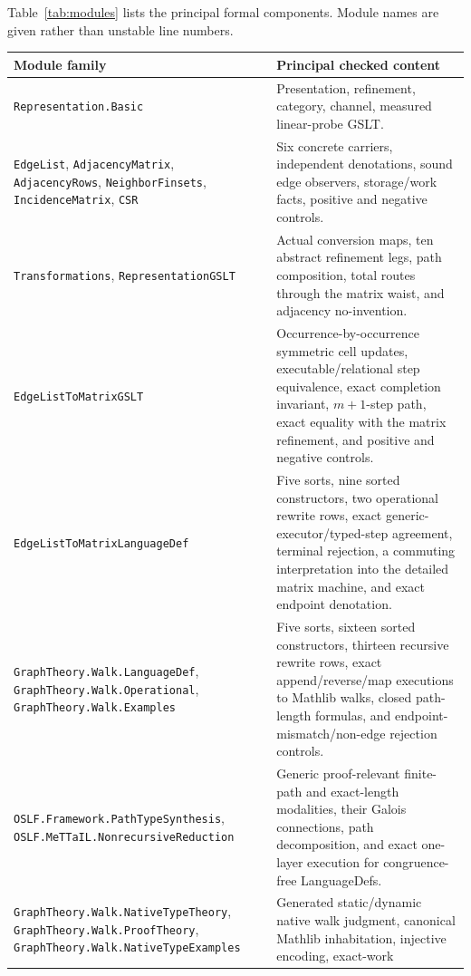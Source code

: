 \documentclass[11pt]{article}
\theoremstyle{remark}
\newcommand{\code}[1]{\texttt{#1}}
\begin{document}
Table~\ref{tab:modules} lists the principal formal components.  Module names
are given rather than unstable line numbers.

\begin{table}[htbp]
\centering
\footnotesize
\renewcommand{\arraystretch}{1.13}
\begin{tabularx}{\textwidth}{@{}p{}X@{}}
\toprule
Module family & Principal checked content \\
\midrule
\code{Representation.Basic} & Presentation, refinement, category, channel,
measured linear-probe GSLT.\\
\code{EdgeList}, \code{AdjacencyMatrix}, \code{AdjacencyRows},
\code{NeighborFinsets}, \code{IncidenceMatrix}, \code{CSR} & Six concrete
carriers, independent denotations, sound edge observers, storage/work facts,
positive and negative controls.\\
\code{Transformations}, \code{RepresentationGSLT} & Actual conversion maps,
ten abstract refinement legs, path composition, total routes through the
matrix waist, and adjacency no-invention.\\
\code{EdgeListToMatrixGSLT} & Occurrence-by-occurrence symmetric cell updates,
executable/relational step equivalence, exact completion invariant,
\(m+1\)-step path, exact equality with the matrix refinement, and positive and
negative controls.\\
\code{EdgeListToMatrixLanguageDef} & Five sorts, nine sorted constructors,
two operational rewrite rows, exact generic-executor/typed-step agreement,
terminal rejection, a commuting interpretation into the detailed matrix
machine, and exact endpoint denotation.\\
\code{GraphTheory.Walk.LanguageDef},
\code{GraphTheory.Walk.Operational},
\code{GraphTheory.Walk.Examples} & Five sorts, sixteen sorted constructors,
thirteen recursive rewrite rows, exact append/reverse/map executions to
Mathlib walks, closed path-length formulas, and endpoint-mismatch/non-edge
rejection controls.\\
\code{OSLF.Framework.PathTypeSynthesis},
\code{OSLF.MeTTaIL.NonrecursiveReduction} & Generic proof-relevant finite-path
and exact-length modalities, their Galois connections, path decomposition,
and exact one-layer execution for congruence-free LanguageDefs.\\
\code{GraphTheory.Walk.NativeTypeTheory},
\code{GraphTheory.Walk.ProofTheory},
\code{GraphTheory.Walk.NativeTypeExamples} & Generated static/dynamic native
walk judgment, canonical Mathlib inhabitation, injective encoding, exact-work

\end{tabularx}
\end{table}
\end{document}
